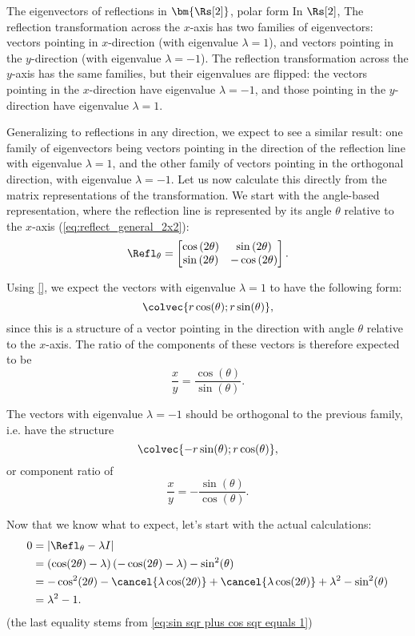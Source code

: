 \begin{example}{The eigenvectors of reflections in $\bm{\Rs[2]}$, polar form}{}
	In $\Rs[2]$, The reflection transformation across the $x$-axis has two families of eigenvectors: vectors pointing in $x$-direction (with eigenvalue $\lambda=1$), and vectors pointing in the $y$-direction (with eigenvalue $\lambda=-1$). The reflection transformation across the $y$-axis has the same families, but their eigenvalues are flipped: the vectors pointing in the $x$-direction have eigenvalue $\lambda=-1$, and those pointing in the $y$-direction have eigenvalue $\lambda=1$.

	\vspace{1em}
	Generalizing to reflections in any direction, we expect to see a similar result: one family of eigenvectors being vectors pointing in the direction of the reflection line with eigenvalue $\lambda=1$, and the other family of vectors pointing in the orthogonal direction, with eigenvalue $\lambda=-1$. Let us now calculate this directly from the matrix representations of the transformation. We start with the angle-based representation, where the reflection line is represented by its angle $\theta$ relative to the $x$-axis (\autoref{eq:reflect_general_2x2}):
	\[
		\Refl_{\theta} = \begin{bmatrix} \cos \left( 2\theta \right) & \sin \left( 2\theta \right) \\ \sin \left( 2\theta \right) & -\cos \left( 2\theta \right) \end{bmatrix}.
	\]

	Using \autoref{}, we expect the vectors with eigenvalue $\lambda=1$ to have the following form:
	\[
		\colvec{r\cos(\theta);r\sin(\theta)},
	\]
	since this is a structure of a vector pointing in the direction with angle $\theta$ relative to the $x$-axis. The ratio of the components of these vectors is therefore expected to be
	\[
		\frac{x}{y} = \frac{\cos(\theta)}{\sin(\theta)}.
	\]

	The vectors with eigenvalue $\lambda=-1$ should be orthogonal to the previous family, i.e. have the structure
	\[
		\colvec{-r\sin(\theta);r\cos(\theta)},
	\]
	or component ratio of
	\[
		\frac{x}{y} = -\frac{\sin(\theta)}{\cos(\theta)}.
	\]

	Now that we know what to expect, let's start with the actual calculations:
	\begin{align*}
		0 &= \left|\Refl_{\theta}-\lambda I\right|\\
		  &= \left(\cos(2\theta)-\lambda\right)\left( -\cos(2\theta)-\lambda \right) - \sin^{2}(\theta)\\
		  &= -\cos^{2}(2\theta)-\cancel{\lambda\cos(2\theta)}+\cancel{\lambda\cos(2\theta)}+\lambda^{2} - \sin^{2}(\theta)\\
		  &= \lambda^{2}-1.
	\end{align*}
	(the last equality stems from \autoref{eq:sin sqr plus cos sqr equals 1})


\end{example}
